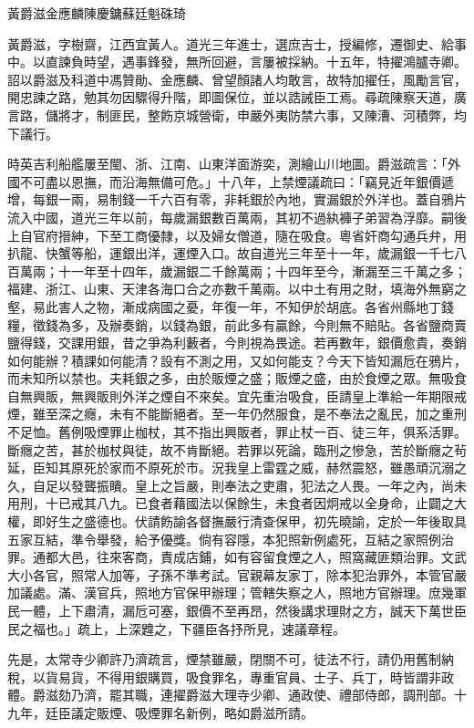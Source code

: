 
\begin{pinyinscope}
黃爵滋金應麟陳慶鏞蘇廷魁硃琦

黃爵滋，字樹齋，江西宜黃人。道光三年進士，選庶吉士，授編修，遷御史、給事中。以直諫負時望，遇事鋒發，無所回避，言屢被採納。十五年，特擢鴻臚寺卿。詔以爵滋及科道中馮贊勛、金應麟、曾望顏諸人均敢言，故特加擢任，風勵言官，開忠諫之路，勉其勿因驟得升階，即圖保位，並以誥誡臣工焉。尋疏陳察天道，廣言路，儲將才，制匪民，整飭京城營衛，申嚴外夷防禁六事，又陳漕、河積弊，均下議行。

時英吉利船艦屢至閩、浙、江南、山東洋面游奕，測繪山川地圖。爵滋疏言：「外國不可盡以恩撫，而沿海無備可危。」十八年，上禁煙議疏曰：「竊見近年銀價遞增，每銀一兩，易制錢一千六百有零，非耗銀於內地，實漏銀於外洋也。蓋自鴉片流入中國，道光三年以前，每歲漏銀數百萬兩，其初不過紈褲子弟習為浮靡。嗣後上自官府搢紳，下至工商優隸，以及婦女僧道，隨在吸食。粵省奸商勾通兵弁，用扒龍、快蟹等船，運銀出洋，運煙入口。故自道光三年至十一年，歲漏銀一千七八百萬兩；十一年至十四年，歲漏銀二千餘萬兩；十四年至今，漸漏至三千萬之多；福建、浙江、山東、天津各海口合之亦數千萬兩。以中土有用之財，填海外無窮之壑，易此害人之物，漸成病國之憂，年復一年，不知伊於胡底。各省州縣地丁錢糧，徵錢為多，及辦奏銷，以錢為銀，前此多有贏餘，今則無不賠貼。各省鹽商賣鹽得錢，交課用銀，昔之爭為利藪者，今則視為畏途。若再數年，銀價愈貴，奏銷如何能辦？積課如何能清？設有不測之用，又如何能支？今天下皆知漏卮在鴉片，而未知所以禁也。夫耗銀之多，由於販煙之盛；販煙之盛，由於食煙之眾。無吸食自無興販，無興販則外洋之煙自不來矣。宜先重治吸食，臣請皇上準給一年期限戒煙，雖至深之癮，未有不能斷絕者。至一年仍然服食，是不奉法之亂民，加之重刑不足恤。舊例吸煙罪止枷杖，其不指出興販者，罪止杖一百、徒三年，俱系活罪。斷癮之苦，甚於枷杖與徒，故不肯斷絕。若罪以死論，臨刑之慘急，苦於斷癮之茍延，臣知其原死於家而不原死於市。況我皇上雷霆之威，赫然震怒，雖愚頑沉溺之久，自足以發聾振瞶。皇上之旨嚴，則奉法之吏肅，犯法之人畏。一年之內，尚未用刑，十已戒其八九。已食者藉國法以保餘生，未食者因炯戒以全身命，止闢之大權，即好生之盛德也。伏請飭諭各督撫嚴行清查保甲，初先曉諭，定於一年後取具五家互結，準令舉發，給予優獎。倘有容隱，本犯照新例處死，互結之家照例治罪。通都大邑，往來客商，責成店鋪，如有容留食煙之人，照窩藏匪類治罪。文武大小各官，照常人加等，子孫不準考試。官親幕友家丁，除本犯治罪外，本管官嚴加議處。滿、漢官兵，照地方官保甲辦理；管轄失察之人，照地方官辦理。庶幾軍民一體，上下肅清，漏卮可塞，銀價不至再昂，然後講求理財之方，誠天下萬世臣民之福也。」疏上，上深韙之，下疆臣各抒所見，速議章程。

先是，太常寺少卿許乃濟疏言，煙禁雖嚴，閉關不可，徒法不行，請仍用舊制納稅，以貨易貨，不得用銀購買，吸食罪名，專重官員、士子、兵丁，時皆謂非政體。爵滋劾乃濟，罷其職，連擢爵滋大理寺少卿、通政使、禮部侍郎，調刑部。十九年，廷臣議定販煙、吸煙罪名新例，略如爵滋所請。


\end{pinyinscope}
